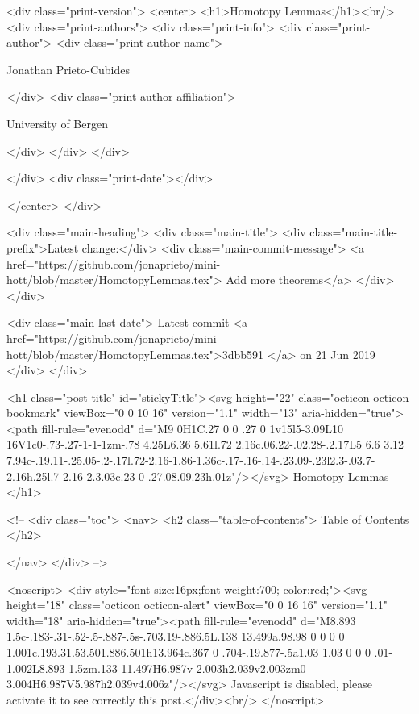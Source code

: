   <div class="print-version">
    <center>
      <h1>Homotopy Lemmas</h1><br/>
        <div class="print-authors">
          <div class="print-info">
            <div class="print-author">
              <div class="print-author-name">
                
                  Jonathan Prieto-Cubides
                
              </div>
              <div class="print-author-affiliation">
                
                  University of Bergen
                
                </div>
            </div>
          </div>
          
          
        </div>
        <div class="print-date"></div>
        
        
    </center>
  </div>

  
  <div class="main-heading">
    <div class="main-title">
      <div class="main-title-prefix">Latest change:</div>
      <div class="main-commit-message">
            <a href="https://github.com/jonaprieto/mini-hott/blob/master/HomotopyLemmas.tex">
              Add more theorems</a>
      </div>
    </div>

    <div class="main-last-date">
      Latest commit <a href="https://github.com/jonaprieto/mini-hott/blob/master/HomotopyLemmas.tex">3dbb591 </a> on  21 Jun 2019
    </div>
  </div>
  
  <h1 class="post-title" id="stickyTitle"><svg height="22" class="octicon octicon-bookmark" viewBox="0 0 10 16" version="1.1" width="13" aria-hidden="true"><path fill-rule="evenodd" d="M9 0H1C.27 0 0 .27 0 1v15l5-3.09L10 16V1c0-.73-.27-1-1-1zm-.78 4.25L6.36 5.61l.72 2.16c.06.22-.02.28-.2.17L5 6.6 3.12 7.94c-.19.11-.25.05-.2-.17l.72-2.16-1.86-1.36c-.17-.16-.14-.23.09-.23l2.3-.03.7-2.16h.25l.7 2.16 2.3.03c.23 0 .27.08.09.23h.01z"/></svg> Homotopy Lemmas
  </h1>

  <!-- 
  <div class="toc">
    <nav>
    <h2 class="table-of-contents"> Table of Contents </h2>
      

    </nav>
  </div>
   -->

  <noscript>
  <div style="font-size:16px;font-weight:700; color:red;"><svg height="18" class="octicon octicon-alert" viewBox="0 0 16 16" version="1.1" width="18" aria-hidden="true"><path fill-rule="evenodd" d="M8.893 1.5c-.183-.31-.52-.5-.887-.5s-.703.19-.886.5L.138 13.499a.98.98 0 0 0 0 1.001c.193.31.53.501.886.501h13.964c.367 0 .704-.19.877-.5a1.03 1.03 0 0 0 .01-1.002L8.893 1.5zm.133 11.497H6.987v-2.003h2.039v2.003zm0-3.004H6.987V5.987h2.039v4.006z"/></svg> Javascript is disabled, please activate it to see correctly this post.</div><br/>
  </noscript>

